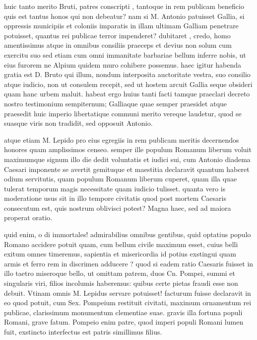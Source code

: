  huic tanto merito Bruti, patres conscripti , tantoque in rem publicam beneficio quis est tantus honos qui non debeatur? nam si M. Antonio patuisset Gallia, si oppressis municipiis et coloniis imparatis in illam ultimam Galliam penetrare potuisset, quantus rei publicae terror impenderet? dubitaret , credo, homo amentissimus atque in omnibus consiliis praeceps et devius non solum cum exercitu suo sed etiam cum omni immanitate barbariae bellum inferre nobis, ut eius furorem ne Alpium quidem muro cohibere possemus. haec igitur habenda gratia est D. Bruto qui illum, nondum interposita auctoritate vestra, suo consilio atque iudicio, non ut consulem recepit, sed ut hostem arcuit Gallia seque obsideri quam hanc urbem maluit. habeat ergo huius tanti facti tamque praeclari decreto nostro testimonium sempiternum; Galliaque quae semper praesidet atque praesedit huic imperio libertatique communi merito vereque laudetur, quod se suasque viris non tradidit, sed opposuit Antonio.

 atque etiam M. Lepido pro eius egregiis in rem publicam meritis decernendos honores quam amplissimos censeo. semper ille populum Romanum liberum voluit maximumque signum illo die dedit voluntatis et iudici sui, cum Antonio diadema Caesari imponente se avertit gemituque et maestitia declaravit quantum haberet odium servitutis, quam populum Romanum liberum cuperet, quam illa quae tulerat temporum magis necessitate quam iudicio tulisset. quanta vero is moderatione usus sit in illo tempore civitatis quod post mortem Caesaris consecutum est, quis nostrum oblivisci potest? Magna haec, sed ad maiora properat oratio.

 quid enim, o di immortales! admirabilius omnibus gentibus, quid optatius populo Romano accidere potuit quam, cum bellum civile maximum esset, cuius belli exitum omnes timeremus, sapientia et misericordia id potius exstingui quam armis et ferro rem in discrimen adducere ? quod si eadem ratio Caesaris fuisset in illo taetro miseroque bello, ut omittam patrem, duos Cn. Pompei, summi et singularis viri, filios incolumis haberemus: quibus certe pietas fraudi esse non debuit. Vtinam omnis M. Lepidus servare potuisset! facturum fuisse declaravit in eo quod potuit, cum Sex. Pompeium restituit civitati, maximum ornamentum rei publicae, clarissimum monumentum clementiae suae. gravis illa fortuna populi Romani, grave fatum. Pompeio enim patre, quod imperi populi Romani lumen fuit, exstincto interfectus est patris simillimus filius.

